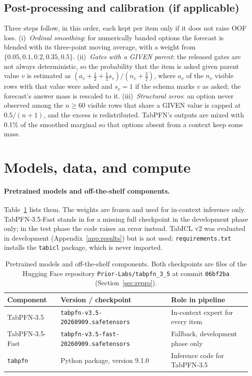 \documentclass{article}
\begin{document}
\subsection{Post-processing and calibration (if applicable)}
\label{sec:post}
Three steps follow, in this order, each kept per item only if it does not raise OOF loss.
(i)~\emph{Ordinal smoothing}: for numerically banded options the forecast is blended with its
three-point moving average, with a weight from $\{0.05, 0.1, 0.2, 0.35, 0.5\}$.
(ii)~\emph{Gates with a GIVEN parent}: the released gates are not always deterministic, so the
probability that the item is asked given parent value $v$ is estimated as
$(a_v + \tfrac12 + \tfrac12 s_v)/(n_v + \tfrac32)$, where $a_v$ of the $n_v$ visible rows with
that value were asked and $s_v = 1$ if the schema marks $v$ as asked; the forecast's answer mass
is rescaled to it.
(iii)~\emph{Structural zeros}: an option never observed among the $n \ge 60$ visible rows that
share a GIVEN value is capped at $0.5/(n+1)$, and the excess is redistributed.
TabPFN's outputs are mixed with 0.1\% of the smoothed marginal so that options absent from a
context keep some mass.

\section{Models, data, and compute}
\label{sec:resources}

\paragraph{Pretrained models and off-the-shelf components.} Table~\ref{tab:models} lists them.
The weights are frozen and used for in-context inference only. TabPFN-3.5-Fast stands in for a
missing full checkpoint in the development phase only; in the test phase the code raises an error
instead. TabICL v2 was evaluated in development (Appendix~\ref{app:results}) but is not used:
\texttt{requirements.txt} installs the \texttt{tabicl} package, which is never imported.

\begin{table}[h]
  \centering
  \small
  \caption{Pretrained models and off-the-shelf components. Both checkpoints are files of the
  Hugging Face repository \texttt{Prior-Labs/tabpfn\_3\_5} at commit \texttt{06bf2ba}
  (Section~\ref{sec:repro}).}
  \label{tab:models}
  \begin{tabular}{@{}lll@{}}
    \toprule
    Component & Version / checkpoint & Role in pipeline  \\
    \midrule
    TabPFN-3.5 & \texttt{tabpfn-v3.5-20260909.safetensors} & In-context expert for every item \\
    TabPFN-3.5-Fast & \texttt{tabpfn-v3.5-fast-20260909.safetensors} & Fallback, development phase only \\
    \texttt{tabpfn} & Python package, version 9.1.0 & Inference code for TabPFN-3.5 \\
    \bottomrule
  \end{tabular}
\end{table}
\end{document}
